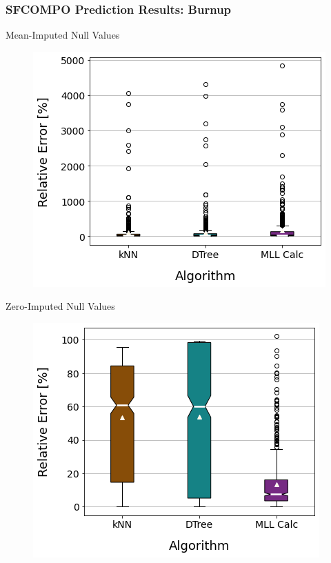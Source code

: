 \begin{frame}
  \frametitle{SFCOMPO Prediction Results: Burnup}
  \begin{adjustwidth}{-15pt}{0pt}
  \begin{minipage}{0.5\textwidth}
    \begin{block}{Mean-Imputed Null Values}
      \begin{figure}
        \centering
        \includegraphics[width=\textwidth]{./figures/sfcompo_boxplots_impnull_pcterr_burn.png}
      \end{figure}
    \end{block}
  \end{minipage}%
  \hfill
  \begin{minipage}{0.5\textwidth}
    \begin{block}{Zero-Imputed Null Values}
      \begin{figure}
        \centering
        \includegraphics[width=\textwidth]{./figures/sfcompo_boxplots_0null_pcterr_burn.png}
      \end{figure}
    \end{block}
  \end{minipage}
  \end{adjustwidth}
\end{frame}

